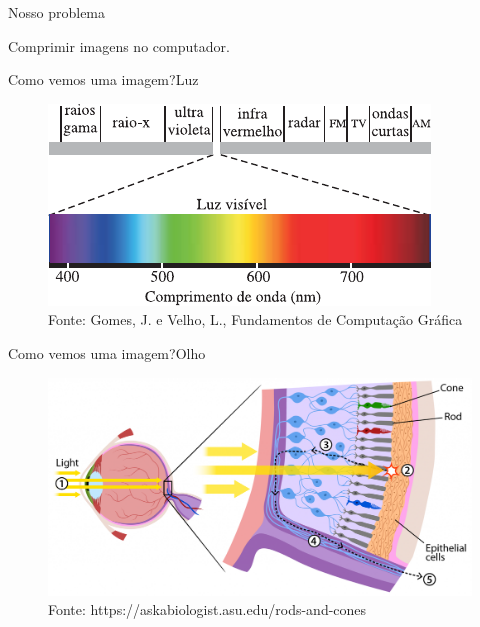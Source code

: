 \documentclass{beamer}
\begin{document}

\begin{frame}{Nosso problema}
    \begin{center}
    Comprimir imagens no computador.
    \end{center}
\end{frame}

\begin{frame}{Como vemos uma imagem?}{Luz}
    \begin{figure}
        \centering
        \includegraphics[scale=1.0]{figs/espectro-luz.pdf}
        \caption{Fonte: Gomes, J. e Velho, L., Fundamentos de Computa\c{c}\~ao
        Gr\'afica}
    \end{figure}
\end{frame}

\begin{frame}{Como vemos uma imagem?}{Olho}
    \begin{figure}
        \centering
        \includegraphics[width=\textwidth]{figs/rods-cones.png}
        \caption{Fonte: https://askabiologist.asu.edu/rods-and-cones}
    \end{figure}
\end{frame}
\end{document}
